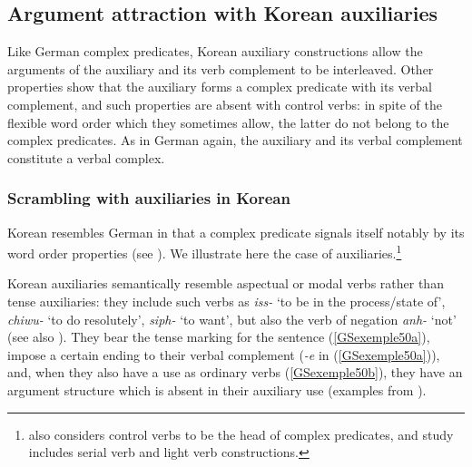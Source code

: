{\subsection{Argument attraction with Korean auxiliaries}\label{GSsection4.2}

Like German complex predicates, Korean auxiliary constructions allow the arguments of the auxiliary and its verb complement to be interleaved. 
Other properties show that the auxiliary forms a complex predicate with its verbal complement, and such properties are absent with control verbs: in spite of the flexible word order which they sometimes allow, the latter do not belong to the complex predicates. 
As in German again, the auxiliary and its verbal complement constitute a verbal complex.

\subsubsection{Scrambling with auxiliaries in Korean}\label{GSsection4.2.1}
 
 
Korean resembles German in that a complex predicate signals itself notably by its word order properties (see \citealt{Sells1991, Chung98a-u, Yoo2003, Kim2016a-u}). We illustrate here the case of auxiliaries.\footnote{\cite{Chung98a-u} also considers control verbs to be the head of complex predicates, and  study includes serial verb and light verb constructions.} 

Korean auxiliaries semantically resemble aspectual or modal verbs rather than tense auxiliaries:
they include such verbs as \emph{iss-} `to be in the process/state of', \emph{chiwu-} `to do
resolutely’, \emph{siph-} `to want', but also the verb of negation \emph{anh-} `not' (see also ). They bear the tense marking for the sentence (\ref{GSexemple50a}), impose a certain ending to their verbal complement (\emph{-e} in (\ref{GSexemple50a})), and, when they also have a use as ordinary verbs (\ref{GSexemple50b}), they have an argument structure which is absent in their auxiliary use (examples from \citealt[85--86]{Kim2016a-u}).

\eal
	\label{GSexemple50} 
    \label{GSexemple50a}

}

